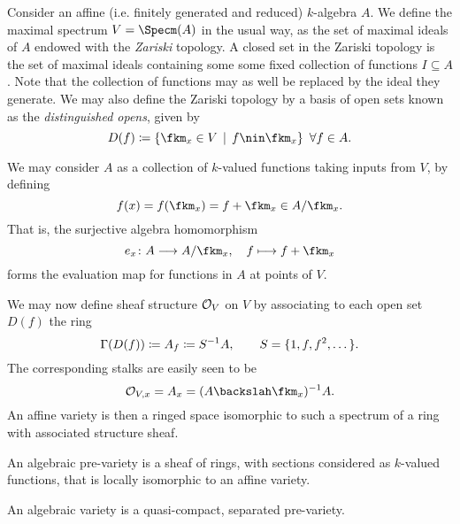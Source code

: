 \documentclass[a4paper]{article}
\begin{document}
\maketitle
Consider an affine (i.e. finitely generated and reduced) $k$-algebra $A$. We define the maximal spectrum $V = \Specm(A)$ in the usual way, as the set of maximal ideals of $A$ endowed with the \emph{Zariski} topology. A closed set in the Zariski topology is the set of maximal ideals containing some some fixed collection of functions $I \subseteq A$. Note that the collection of functions may as well be replaced by the ideal they generate.
We may also define the Zariski topology by a basis of open sets known as the \emph{distinguished opens}, given by
\[
    D(f) \ceq \{\fkm_x \in V \st f \nin \fkm_x\} \cndall f \in A.
\]

We may consider $A$ as a collection of $k$-valued functions taking inputs from $V$, by defining
\[
    f(x) = f(\fkm_x) = f + \fkm_x \in A/\fkm_x.
\]
That is, the surjective algebra homomorphism
\[
    \vfunc{e_x}{A}{A/\fkm_x}{f}{f + \fkm_x}
\]
forms the evaluation map for functions in $A$ at points of $V$.

We may now define sheaf structure $\mathcal{O}_V$ on $V$ by associating to each open set $D(f)$ the ring
\[
    \Gamma(D(f)) \coloneqq A_f \coloneqq S^{-1}A, \qquad S = \{1, f, f^2, \dots\}.
\]
The corresponding stalks are easily seen to be
\[
    \cO_{V,x} = A_x = (A\bsl\fkm_x)^{-1}A.
\]
An affine variety is then a ringed space isomorphic to such a spectrum of a ring with associated structure sheaf.

An algebraic pre-variety is a sheaf of rings, with sections considered as $k$-valued functions, that is locally isomorphic to an affine variety.

An algebraic variety is a quasi-compact, separated pre-variety.
\end{document}
